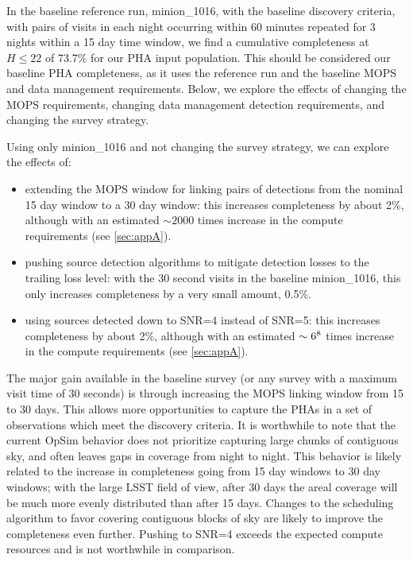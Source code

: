 In the baseline reference run, minion\_1016, with the baseline discovery criteria, with pairs of visits in each night occurring within 60 minutes repeated for 3 nights within a 15 day time window, we find a cumulative completeness at $H\le22$ of 73.7\% for our PHA input population. This should be considered our baseline PHA completeness, as it uses the reference run and the baseline MOPS and data management requirements. Below, we explore the effects of changing the MOPS requirements, changing data management detection requirements, and changing the survey strategy.

Using only minion\_1016 and not changing the survey strategy, we can explore the effects of:
\begin{itemize}
\item extending the MOPS window for linking pairs of detections from the nominal 15 day window to a 30 day window: this increases completeness by about 2\%, although with an estimated $\sim2000$ times increase in the compute requirements (see \ref{sec:appA}).
\item pushing source detection algorithms to mitigate detection losses to the trailing loss level: with the 30 second visits in the baseline minion\_1016, this only increases completeness by a very small amount, 0.5\%.
\item using sources detected down to SNR=4 instead of SNR=5: this increases completeness by about 2\%, although with an estimated $\sim6\time10^8$ times increase in the compute requirements (see \ref{sec:appA}). 
\end{itemize}

The major gain available in the baseline survey (or any survey with a maximum visit time of 30 seconds) is through increasing the MOPS linking window from 15 to 30 days. This allows more opportunities to capture the PHAs in a set of observations which meet the discovery criteria. It is worthwhile to note that the current OpSim behavior does not prioritize capturing large chunks of contiguous sky, and often leaves gaps in coverage from night to night. This behavior is likely related to the increase in completeness going from 15 day windows to 30 day windows; with the large LSST field of view, after 30 days the areal coverage will be much more evenly distributed than after 15 days. Changes to the scheduling algorithm to favor covering contiguous blocks of sky are likely to improve the completeness even further.  Pushing to SNR=4 exceeds the expected compute resources and is not worthwhile in comparison.

